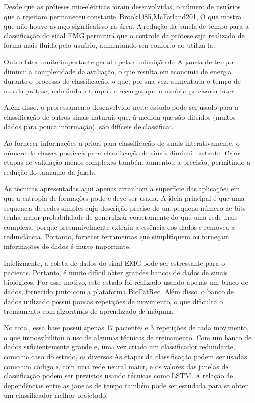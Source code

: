 \documentclass[a4paper, 12pt]{ppgeb}
\begin{document}
Desde que as próteses mio-elétricas foram desenvolvidas, o número de usuários que a rejeitam permaneceu constante~\cite{resumoestendido}{Brook1985,McFarland201}, O que mostra que não houve avanço significativo na área. A redução da janela de tempo para a classificação do sinal EMG permitirá que o controle da prótese seja realizado de forma mais fluida pelo usuário, aumentando seu conforto ao utilizá-la. 

Outro fator muito importante gerado pela diminuição da A janela de tempo diminui a complexidade da avaliação, o que resulta em economia de energia durante o processo de classificação, o que, por sua vez, aumentaria o tempo de uso da prótese, reduzindo o tempo de recargas que o usuário precisaria fazer. 

Além disso, o processamento desenvolvido neste estudo pode ser usado para a classificação de outros sinais naturais que, à medida que são diluídos (muitos dados para pouca informação), são difíceis de classificar.


Ao fornecer informações a priori para classificação de sinais interativamente, o número de classes possíveis para classificação de sinais diminui bastante. Criar etapas de validação menos complexas também aumentou a precisão, permitindo a redução do tamanho da janela. 

As técnicas apresentadas aqui apenas arranham a superfície das aplicações em que a entropia de formações pode e deve ser usada. A ideia principal é que uma sequencia de redes simples cuja descrição precise de um pequeno número de bits tenha maior probabilidade de generalizar corretamente do que uma rede mais complexa, porque presumivelmente extraiu a essência dos dados e removeu a redundância. Portanto, fornecer ferramentas que simplifiquem ou forneçam informações de dados é muito importante.

Infelizmente, a coleta de dados do sinal EMG pode ser estressante para o paciente. Portanto, é muito difícil obter grandes bancos de dados de sinais biológicos. Por esse motivo, este estudo foi realizado usando apenas um banco de dados, fornecido junto com a plataforma BioPatRec. Além disso, o banco de dados utilizado possui poucas repetições de movimento, o que dificulta o treinamento com algoritmos de aprendizado de máquina. 

No total, essa base possui apenas 17 pacientes e 3 repetições de cada movimento, o que impossibilitou o uso de algumas técnicas de treinamento. Com um banco de dados suficientemente grande e, uma vez criado um classificador redundante, como no caso do estudo, os diversos As etapas da classificação podem ser usadas como um código e, com uma rede neural maior, e os valores das janelas de classificação podem ser previstos usando técnicas como LSTM. A relação de dependências entre as janelas de tempo também pode ser estudada para se obter um classificador melhor projetado.
\end{document}
